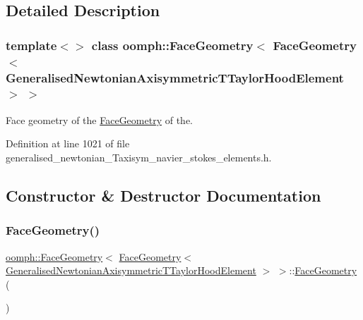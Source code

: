 \subsection{Detailed Description}
\subsubsection*{template$<$$>$\newline
class oomph\+::\+Face\+Geometry$<$ Face\+Geometry$<$ Generalised\+Newtonian\+Axisymmetric\+T\+Taylor\+Hood\+Element $>$ $>$}

Face geometry of the \hyperlink{classoomph_1_1FaceGeometry}{Face\+Geometry} of the. 

Definition at line 1021 of file generalised\+\_\+newtonian\+\_\+\+Taxisym\+\_\+navier\+\_\+stokes\+\_\+elements.\+h.



\subsection{Constructor \& Destructor Documentation}
\mbox{\label{classoomph_1_1FaceGeometry_3_01FaceGeometry_3_01GeneralisedNewtonianAxisymmetricTTaylorHoodElement_01_4_01_4_ab167cdc517078aa6742c00aa36cf75a0}} 
\subsubsection{\texorpdfstring{Face\+Geometry()}{FaceGeometry()}}
{\footnotesize\ttfamily \hyperlink{classoomph_1_1FaceGeometry}{oomph\+::\+Face\+Geometry}$<$ \hyperlink{classoomph_1_1FaceGeometry}{Face\+Geometry}$<$ \hyperlink{classoomph_1_1GeneralisedNewtonianAxisymmetricTTaylorHoodElement}{Generalised\+Newtonian\+Axisymmetric\+T\+Taylor\+Hood\+Element} $>$ $>$\+::\hyperlink{classoomph_1_1FaceGeometry}{Face\+Geometry} (\begin{DoxyParamCaption}{ }\end{DoxyParamCaption})\hspace{0.3cm}{\ttfamily [inline]}}



